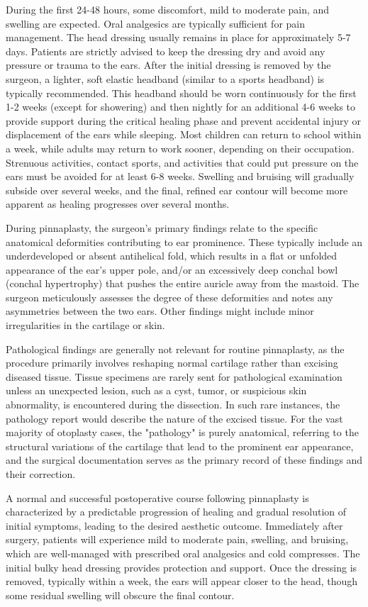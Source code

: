 During the first 24-48 hours, some discomfort, mild to moderate pain, and swelling are expected. Oral analgesics are typically sufficient for pain management. The head dressing usually remains in place for approximately 5-7 days. Patients are strictly advised to keep the dressing dry and avoid any pressure or trauma to the ears. After the initial dressing is removed by the surgeon, a lighter, soft elastic headband (similar to a sports headband) is typically recommended. This headband should be worn continuously for the first 1-2 weeks (except for showering) and then nightly for an additional 4-6 weeks to provide support during the critical healing phase and prevent accidental injury or displacement of the ears while sleeping. Most children can return to school within a week, while adults may return to work sooner, depending on their occupation. Strenuous activities, contact sports, and activities that could put pressure on the ears must be avoided for at least 6-8 weeks. Swelling and bruising will gradually subside over several weeks, and the final, refined ear contour will become more apparent as healing progresses over several months.

During pinnaplasty, the surgeon's primary findings relate to the specific anatomical deformities contributing to ear prominence. These typically include an underdeveloped or absent antihelical fold, which results in a flat or unfolded appearance of the ear's upper pole, and/or an excessively deep conchal bowl (conchal hypertrophy) that pushes the entire auricle away from the mastoid. The surgeon meticulously assesses the degree of these deformities and notes any asymmetries between the two ears. Other findings might include minor irregularities in the cartilage or skin.

Pathological findings are generally not relevant for routine pinnaplasty, as the procedure primarily involves reshaping normal cartilage rather than excising diseased tissue. Tissue specimens are rarely sent for pathological examination unless an unexpected lesion, such as a cyst, tumor, or suspicious skin abnormality, is encountered during the dissection. In such rare instances, the pathology report would describe the nature of the excised tissue. For the vast majority of otoplasty cases, the "pathology" is purely anatomical, referring to the structural variations of the cartilage that lead to the prominent ear appearance, and the surgical documentation serves as the primary record of these findings and their correction.

A normal and successful postoperative course following pinnaplasty is characterized by a predictable progression of healing and gradual resolution of initial symptoms, leading to the desired aesthetic outcome. Immediately after surgery, patients will experience mild to moderate pain, swelling, and bruising, which are well-managed with prescribed oral analgesics and cold compresses. The initial bulky head dressing provides protection and support. Once the dressing is removed, typically within a week, the ears will appear closer to the head, though some residual swelling will obscure the final contour.

